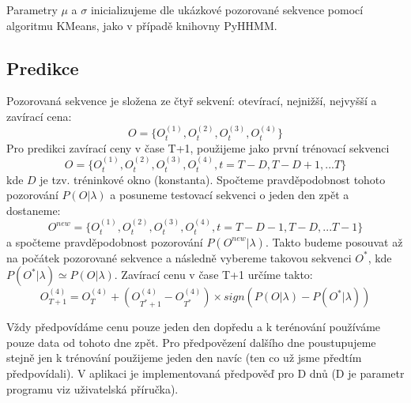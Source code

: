 Parametry \(\mu\) a \(\sigma\) inicializujeme dle ukázkové pozorované sekvence pomocí algoritmu KMeans, jako v případě knihovny PyHHMM.

\subsection{Predikce}
Pozorovaná sekvence je složena ze čtyř sekvení: otevírací, nejnižší, nejvyšší a zavírací cena:
\[ O = \{O_t^{(1)},O_t^{(2)},O_t^{(3)},O_t^{(4)}\} \]
Pro predikci zavírací ceny v čase T+1, použijeme jako první trénovací sekvenci
\[ O = \{O_t^{(1)},O_t^{(2)},O_t^{(3)},O_t^{(4)}, t=T-D,T-D+1,...T\} \]
kde \(D\) je tzv. tréninkové okno (konstanta).
Spočteme pravděpodobnost tohoto pozorování \(P(O|\lambda)\) a posuneme testovací sekvenci o jeden den zpět a dostaneme:
\[ O^{new} = \{O_t^{(1)},O_t^{(2)},O_t^{(3)},O_t^{(4)}, t=T-D-1,T-D,...T-1\} \]
a spočteme pravděpodobnost pozorování \(P(O^{new}|\lambda)\). Takto budeme posouvat až na počátek pozorované sekvence a následně vybereme takovou sekvenci \(O^*\), kde \(P(O^*|\lambda)\simeq P(O|\lambda)\).
Zavírací cenu v čase T+1 určíme takto:
\[ O_{T+1}^{(4)} = O_T^{(4)} + (O_{T^*+1}^{(4)} - O_{T^*}^{(4)}) \times sign(P(O|\lambda)-P(O^*|\lambda)) \]

Vždy předpovídáme cenu pouze jeden den dopředu a k terénování používáme pouze data od tohoto dne zpět. Pro předpovězení dalšího dne poustupujeme stejně jen k trénování použijeme jeden den navíc (ten co už jsme předtím předpovídali). V aplikaci je implementovaná předpověď pro D dnů (D je parametr programu viz uživatelská příručka).

\clearpage
